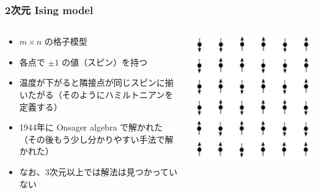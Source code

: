 \documentclass{beamer}
\theoremstyle{definition}
\begin{document}
\begin{frame}
    \frametitle{2次元 Ising model}

    \begin{columns}[c]
        \begin{column}{0.7\linewidth}
            \begin{itemize}
                \item \(m \times n\) の格子模型
                \item 各点で \(\pm 1\) の値（スピン）を持つ
                \item 温度が下がると隣接点が同じスピンに揃いたがる（そのようにハミルトニアンを定義する）
                \item 1944年に Onsager algebra で解かれた（その後もう少し分かりやすい手法で解かれた）
                \item なお、3次元以上では解法は見つかっていない
            \end{itemize}
        \end{column}
        \begin{column}{0.3\linewidth}
            \includegraphics[width=\linewidth]{images/ising.jpeg}
        \end{column}
    \end{columns}
\end{frame}
\end{document}
